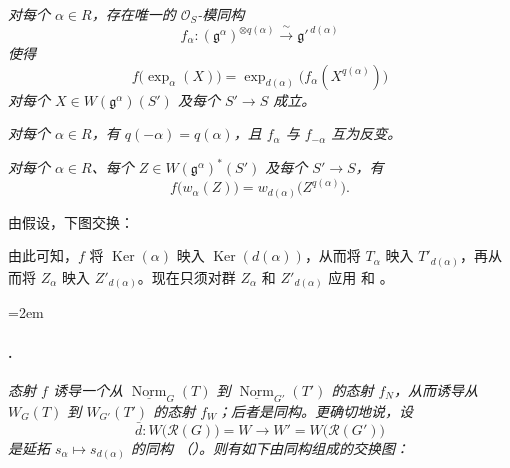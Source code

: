 \textit{\textup{} 对每个 \(\alpha\in R\)，存在唯一的 \(\mathcal O_S\)-模同构}
\[
  f_\alpha:
  (\mathfrak g^\alpha)^{\otimes q(\alpha)}
  \xrightarrow{\;\sim\;}
  \mathfrak g'^{\,d(\alpha)}
\]
\textit{使得}
\[
  f\bigl(\exp_\alpha(X)\bigr)
  =
  \exp_{d(\alpha)}
  \bigl(f_\alpha(X^{q(\alpha)})\bigr)
\]
\textit{对每个 \(X\in W(\mathfrak g^\alpha)(S')\) 及每个 \(S'\to S\) 成立。}

\textit{\textup{} 对每个 \(\alpha\in R\)，有 \(q(-\alpha)=q(\alpha)\)，且 \(f_\alpha\) 与 \(f_{-\alpha}\) 互为反变。}

\textit{\textup{} 对每个 \(\alpha\in R\)、每个 \(Z\in W(\mathfrak g^\alpha)^*(S')\) 及每个 \(S'\to S\)，有}
\[
  f\bigl(w_\alpha(Z)\bigr)
  =
  w_{d(\alpha)}\bigl(Z^{q(\alpha)}\bigr).
\]

由假设，下图交换：
\begin{center}
\end{center}

由此可知，\(f\) 将 \(\operatorname{Ker}(\alpha)\) 映入 \(\operatorname{Ker}(d(\alpha))\)，从而将 \(T_\alpha\) 映入 \(T'_{d(\alpha)}\)，再从而将 \(Z_\alpha\) 映入 \(Z'_{d(\alpha)}\)。现在只须对群 \(Z_\alpha\) 和 \(Z'_{d(\alpha)}\) 应用 和 。

\begingroup
\emergencystretch=2em
\paragraph{.}
\textit{态射 \(f\) 诱导一个从 \(\underline{\operatorname{Norm}}_G(T)\) 到 \(\underline{\operatorname{Norm}}_{G'}(T')\) 的态射 \(f_N\)，从而诱导从 \(W_G(T)\) 到 \(W_{G'}(T')\) 的态射 \(f_W\)；后者是同构。更确切地说，设}
\[
  \bar d:W\bigl(\mathscr R(G)\bigr)=W
  \longrightarrow
  W'=W\bigl(\mathscr R(G')\bigr)
\]
\textit{是延拓 \(s_\alpha\mapsto s_{d(\alpha)}\) 的同构 \textup{（）}。则有如下由同构组成的交换图：}
\endgroup


